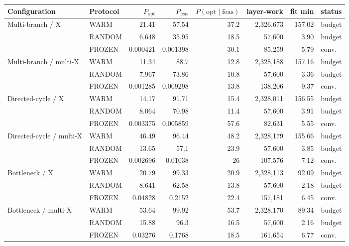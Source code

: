 \begin{tabular}{llrrrrrl}
\toprule
Configuration & Protocol & $P_{\mathrm{opt}}$ & $P_{\mathrm{feas}}$ & $P(\mathrm{opt}\mid\mathrm{feas})$ & layer-work & fit min & status \\
\midrule
Multi-branch / X & WARM & 21.41 & 57.54 & 37.2 & 2{,}326{,}673 & 157.02 & budget \\
 & RANDOM & 6.648 & 35.95 & 18.5 & 57{,}600 & 3.90 & budget \\
 & FROZEN & 0.000421 & 0.001398 & 30.1 & 85{,}259 & 5.79 & conv. \\
\addlinespace
Multi-branch / multi-X & WARM & 11.34 & 88.7 & 12.8 & 2{,}328{,}188 & 157.16 & budget \\
 & RANDOM & 7.967 & 73.86 & 10.8 & 57{,}600 & 3.36 & budget \\
 & FROZEN & 0.001285 & 0.009298 & 13.8 & 138{,}206 & 9.37 & conv. \\
\addlinespace
Directed-cycle / X & WARM & 14.17 & 91.71 & 15.4 & 2{,}328{,}011 & 156.55 & budget \\
 & RANDOM & 8.064 & 70.98 & 11.4 & 57{,}600 & 3.91 & budget \\
 & FROZEN & 0.003375 & 0.005859 & 57.6 & 82{,}631 & 5.55 & conv. \\
\addlinespace
Directed-cycle / multi-X & WARM & 46.49 & 96.44 & 48.2 & 2{,}328{,}179 & 155.66 & budget \\
 & RANDOM & 13.65 & 57.1 & 23.9 & 57{,}600 & 3.85 & budget \\
 & FROZEN & 0.002696 & 0.01038 & 26 & 107{,}576 & 7.12 & conv. \\
\addlinespace
Bottleneck / X & WARM & 20.79 & 99.33 & 20.9 & 2{,}328{,}113 & 92.09 & budget \\
 & RANDOM & 8.641 & 62.58 & 13.8 & 57{,}600 & 2.18 & budget \\
 & FROZEN & 0.04828 & 0.2152 & 22.4 & 157{,}181 & 6.45 & conv. \\
\addlinespace
Bottleneck / multi-X & WARM & 53.64 & 99.92 & 53.7 & 2{,}328{,}170 & 89.34 & budget \\
 & RANDOM & 15.88 & 96.3 & 16.5 & 57{,}600 & 2.16 & budget \\
 & FROZEN & 0.03276 & 0.1768 & 18.5 & 161{,}654 & 6.77 & conv. \\

\bottomrule
\end{tabular}
